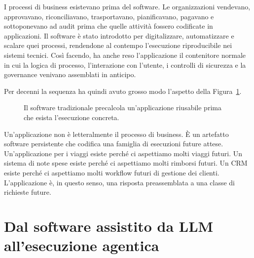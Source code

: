 \documentclass[10pt,oneside,openany]{book}
\begin{document}
I processi di business esistevano prima del software. Le organizzazioni vendevano, approvavano, riconciliavano, trasportavano, pianificavano, pagavano e sottoponevano ad audit prima che quelle attività fossero codificate in applicazioni. Il software è stato introdotto per digitalizzare, automatizzare e scalare quei processi, rendendone al contempo l'esecuzione riproducibile nei sistemi tecnici. Così facendo, ha anche reso l'applicazione il contenitore normale in cui la logica di processo, l'interazione con l'utente, i controlli di sicurezza e la governance venivano assemblati in anticipo.

Per decenni la sequenza ha quindi avuto grosso modo l'aspetto della Figura~\ref{fig:traditional-sequence}.

\begin{figure}[!htbp]
\centering
{}
\caption{Il software tradizionale precalcola un'applicazione riusabile prima che esista l'esecuzione concreta.}
\label{fig:traditional-sequence}
\end{figure}

Un'applicazione non è letteralmente il processo di business. È un artefatto software persistente che codifica una famiglia di esecuzioni future attese. Un'applicazione per i viaggi esiste perché ci aspettiamo molti viaggi futuri. Un sistema di note spese esiste perché ci aspettiamo molti rimborsi futuri. Un CRM esiste perché ci aspettiamo molti workflow futuri di gestione dei clienti. L'applicazione è, in questo senso, una risposta preassemblata a una classe di richieste future.

\section{Dal software assistito da LLM all'esecuzione agentica}\label{sec:agentic}
\end{document}
